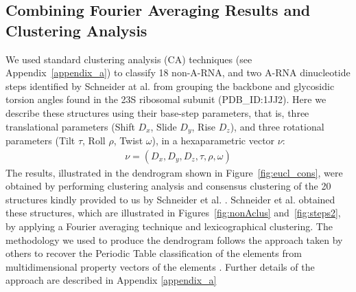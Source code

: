 \subsection{Combining Fourier Averaging Results and Clustering Analysis}
We   used   standard   clustering   analysis  (CA)   techniques   (see
Appendix~\ref{appendix_a})  to classify  18 non-A-RNA,  and  two A-RNA
dinucleotide steps identified  by Schneider at al.\cite{schneider2004}
from grouping the backbone and glycosidic torsion angles  found
in the  23S ribosomal subunit (PDB\_ID:1JJ2).  Here  we describe these
structures   using  their   base-step  parameters,   that   is,  three
translational parameters  (Shift $D_x$, Slide $D_y$,  Rise $D_z$), and
three   rotational  parameters  (Tilt   $\tau$,  Roll   $\rho$,  Twist
$\omega$), in a hexaparametric vector $\nu$:
\begin{gather}
\nu = (D_x, D_y, D_z, \tau, \rho, \omega)
\end{gather}
The    results,    illustrated   in    the    dendrogram   shown    in
Figure~\ref{fig:eucl_cons},  were  obtained  by performing  clustering
analysis and consensus clustering of the 20 structures kindly provided
to  us  by  Schneider  et  al.   \cite{schneider2004}.   Schneider  et
al.   obtained   these    structures,   which   are   illustrated   in
Figures~\ref{fig:nonAclus} and~\ref{fig:steps2}, by applying a Fourier
averaging technique  and lexicographical clustering.   The methodology
we used to produce the dendrogram follows the approach taken by others
to  recover the  Periodic Table  classification of  the  elements from
multidimensional property vectors  of the elements \cite{restrepo2004,
  restrepo2006}.  Further details  of  the approach  are described  in
Appendix \ref{appendix_a}
